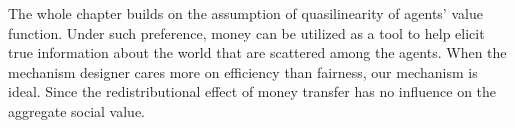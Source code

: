 The whole chapter builds on the assumption of quasilinearity of agents' value function. Under such preference,  money can be utilized 
as a tool to help elicit true information about the world that are scattered among the agents.
When the mechanism designer cares more on efficiency than fairness, our mechanism is ideal. Since the redistributional effect of money 
transfer has no influence on the aggregate social value.






